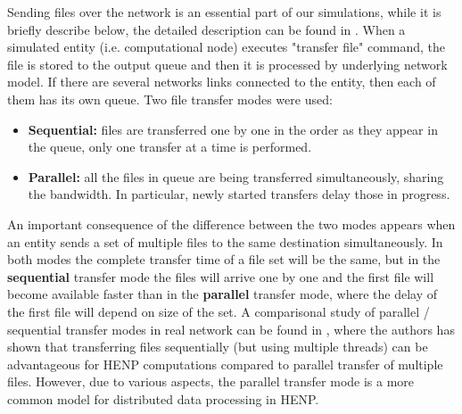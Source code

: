 \documentclass{svjour3}                     %
\begin{document}
Sending files over the network is an essential part of our simulations, while it is briefly describe below, the detailed description can be found in \cite{GridSimNetwork}. When a simulated entity (i.e. computational node) executes "transfer file" command, the file is stored to the output queue and then it is processed by underlying network model. If there are several networks links connected to the entity, then each of them has its own queue. Two file transfer modes were used:
\begin{itemize}
\item \textbf{Sequential:} files are transferred one by one in the order as they appear in the queue, only one transfer at a time is performed. 
\item \textbf{Parallel:} all the files in queue are being transferred simultaneously, sharing the bandwidth.  In particular, newly started transfers delay those in progress.
\end{itemize}
An important consequence of the difference between the two modes appears when an entity sends a set of multiple files to the same destination simultaneously. In both modes the complete transfer time of a file set will be the same, but in the \textbf{sequential} transfer mode the files will arrive one by one and the first file will become available faster than in the \textbf{parallel} transfer mode, where the delay of the first file will depend on size of the set. A comparisonal study of parallel / sequential transfer modes in real network can be found in \cite{Zerola}, where the authors has shown that transferring files sequentially (but using multiple threads) can be advantageous for HENP computations compared to parallel transfer of multiple files. However, due to various aspects, the parallel transfer mode is a more common model for distributed data processing in HENP.
\end{document}
